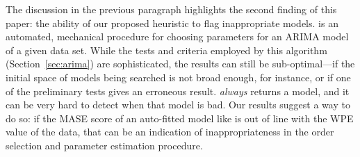 The discussion in the previous paragraph highlights the second finding
of this paper: the ability of our proposed heuristic to flag
inappropriate models.  \arima is an automated, mechanical procedure
for choosing parameters for an ARIMA model of a given data set.  While
the tests and criteria employed by this algorithm
(Section~\ref{sec:arima}) are sophisticated, the results can still be
sub-optimal---if the initial space of models being searched is not
broad enough, for instance, or if one of the preliminary tests gives
an erroneous result.  \arima \emph{always} returns a model, and it can
be very hard to detect when that model is bad.  Our results suggest a
way to do so: if the MASE score of an auto-fitted model like \arima is
out of line with the WPE value of the data, that can be an indication
of inappropriateness in the order selection and parameter estimation
procedure.  


